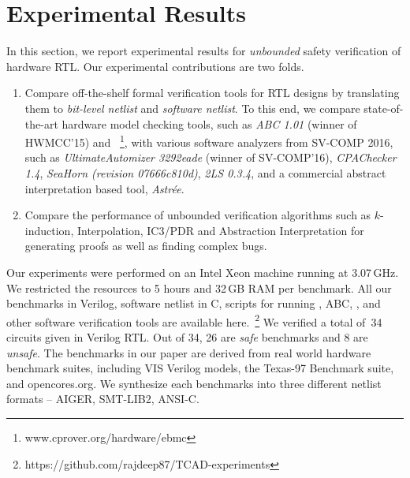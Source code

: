 \section{Experimental Results}\label{sec:results}
In this section, we report experimental results for \emph{unbounded} safety 
verification of hardware RTL.  Our experimental contributions are two folds.
%
\begin{enumerate}
  \item Compare off-the-shelf formal verification tools for RTL designs by translating  
     them to \emph{bit-level netlist} and \emph{software netlist}.  
    To this end, we compare state-of-the-art hardware model checking tools, such as 
    \emph{ABC 1.01} (winner of HWMCC'15) and 
    \ebmcv~\footnote{\scriptsize{www.cprover.org/hardware/ebmc}}, 
    with various software analyzers from SV-COMP 2016, such as 
    \emph{UltimateAutomizer 3292eade} (winner of SV-COMP'16), 
    \emph{CPAChecker 1.4}, 
    \emph{SeaHorn (revision 07666c810d)}, \emph{2LS 0.3.4}, 
    and a commercial abstract 
    interpretation based tool, \emph{Astr{\'e}e}.  
  
 \item  Compare the performance of unbounded verification algorithms such as $k$-induction, 
    Interpolation, IC3/PDR and Abstraction Interpretation for generating proofs as well as 
    finding complex bugs. 
\end{enumerate}
%
Our experiments were performed on an Intel Xeon machine running at
3.07\,GHz.  We restricted the resources to 5 hours and 32\,GB RAM per
benchmark.  All our benchmarks in Verilog, software netlist in C, 
scripts for running \yosys, ABC, \ebmcv, and other software 
verification tools are available here.~\footnote{\scriptsize{https://github.com/rajdeep87/TCAD-experiments}}
%
%
We verified a total of~34 circuits given in Verilog RTL.  Out of 34, 26 
are \emph{safe} benchmarks and 8 are \emph{unsafe}.  The benchmarks in 
our paper are derived from real world hardware benchmark suites, including 
VIS Verilog models, the Texas-97 Benchmark suite, and opencores.org. We synthesize 
each benchmarks into three different netlist formats -- AIGER, SMT-LIB2, ANSI-C.
